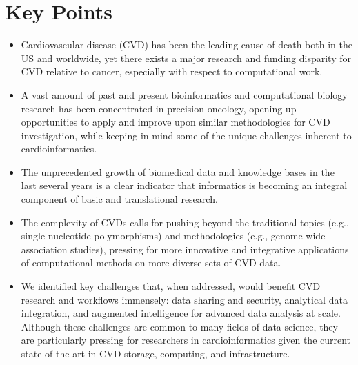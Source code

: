 \documentclass[11pt,letterpaper]{article}
\begin{document}
	\section*{Key Points}
	\begin{itemize}
		\item Cardiovascular disease (CVD) has been the leading cause of death both in the US and worldwide, yet there exists a major research and funding disparity for CVD relative to cancer, especially with respect to computational work.
		\item A vast amount of past and present bioinformatics and computational biology research has been concentrated in precision oncology, opening up opportunities to apply and improve upon similar methodologies for CVD investigation, while keeping in mind some of the unique challenges inherent to cardioinformatics.
		\item The unprecedented growth of biomedical data and knowledge bases in the last several years is a clear indicator that informatics is becoming an integral component of basic and translational research.
		\item The complexity of CVDs calls for pushing beyond the traditional topics (e.g., single nucleotide polymorphisms) and methodologies (e.g., genome-wide association studies), pressing for more innovative and integrative applications of computational methods on more diverse sets of CVD data.
		\item We identified key challenges that, when addressed, would benefit CVD research and workflows immensely: data sharing and security, analytical data integration, and augmented intelligence for advanced data analysis at scale.  Although these challenges are common to many fields of data science, they are particularly pressing for researchers in cardioinformatics given the current state-of-the-art in CVD storage, computing, and infrastructure.
	\end{itemize}
	
\end{document}
